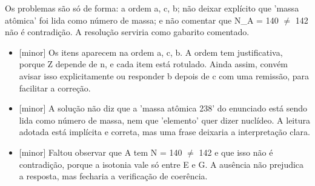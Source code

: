 \documentclass{article}%
\begin{document}
\newline%
Os problemas são só de forma: a ordem a, c, b; não deixar explícito que 'massa atômica' foi lida como número de massa; e não comentar que N\_A = 140 $\neq$ 142 não é contradição. A resolução serviria como gabarito comentado.%
\begin{itemize}%
\item%
{[}minor{]} Os itens aparecem na ordem a, c, b. A ordem tem justificativa, porque Z depende de n, e cada item está rotulado. Ainda assim, convém avisar isso explicitamente ou responder b depois de c com uma remissão, para facilitar a correção.%
\item%
{[}minor{]} A solução não diz que a 'massa atômica 238' do enunciado está sendo lida como número de massa, nem que 'elemento' quer dizer nuclídeo. A leitura adotada está implícita e correta, mas uma frase deixaria a interpretação clara.%
\item%
{[}minor{]} Faltou observar que A tem N = 140 $\neq$ 142 e que isso não é contradição, porque a isotonia vale só entre E e G. A ausência não prejudica a resposta, mas fecharia a verificação de coerência.%
\end{itemize}%
\end{document}
